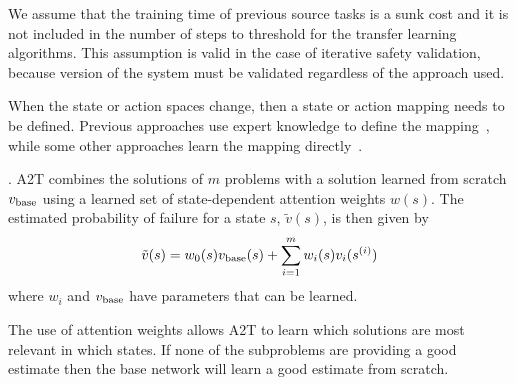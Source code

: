 We assume that the training time of previous source tasks is a sunk cost and it is not included in the number of steps to threshold for the transfer learning algorithms. This assumption is valid in the case of iterative safety validation, because version of the system must be validated regardless of the approach used. 


\cite{lazaric2012transfer}
When the state or action spaces change, then a state or action mapping needs to be defined. Previous approaches use expert knowledge to define the mapping~\cite{taylor2007transfer}, while some other approaches learn the mapping directly~\cite{taylor2008autonomous}. 


\cite{rajendran2017attend}. A2T combines the solutions of $m$ problems with a solution learned from scratch $v_{\rm base}$ using a learned set of state-dependent attention weights $w(s)$. The estimated probability of failure for a state $s$, $\tilde{v}(s)$, is then given by 
\begin{equation}
\tilde{v}(s) = w_0(s) v_{\rm base}(s) + \sum_{i=1}^m w_i(s) v_i(s^{(i)}) \label{eq:A2T}
\end{equation}
where $w_i$ and $v_{\rm base}$ have parameters that can be learned.

The use of attention weights allows A2T to learn which solutions are most relevant in which states. If none of the subproblems are providing a good estimate then the base network will learn a good estimate from scratch.


